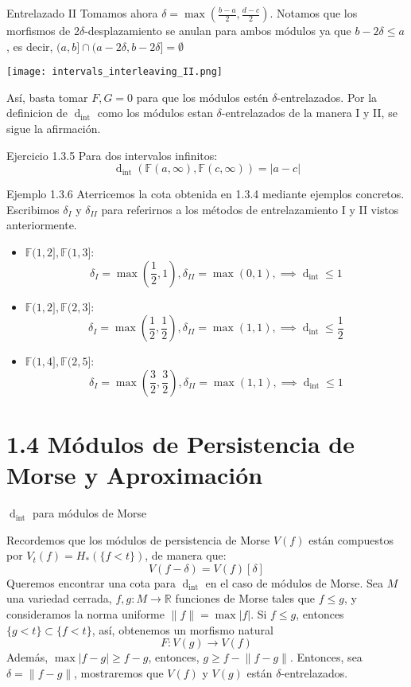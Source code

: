 \documentclass{beamer}
\newcounter{Ejercicio}
\newcommand\norm[1]{\lVert#1\rVert}
\def\dint{\operatorname{d}_{\operatorname{int}}}
\def \FF{{\mathbb F}}
\def \re{{\mathbb R}}
\begin{document}
\begin{frame}{Entrelazado II}
Tomamos ahora \(\delta=\max \left( \frac{b-a}{2}, \frac{d-c}{2} \right)\). Notamos que los morfismos de 2$\delta$-desplazamiento se anulan para ambos módulos ya que \(b-2\delta\leq a\), es decir, \((a,b]\cap(a-2\delta,b-2\delta]=\emptyset\)
\begin{center}
\texttt{[image: intervals\_interleaving\_II.png]}
\end{center}
\pause
Así, basta tomar $F, G = 0$ para que los módulos estén $\delta$-entrelazados. Por la definicion de $\dint$ como los módulos estan $\delta$-entrelazados de la manera I y II, se sigue la afirmación. 
\end{frame}

\begin{frame}{Ejercicio 1.3.5}
Para dos intervalos infinitos:
\[\dint(\FF(a,\infty),\FF(c,\infty))=|a-c|\]

\end{frame}

\begin{frame}{Ejemplo 1.3.6}
Aterricemos la cota obtenida en 1.3.4 mediante ejemplos concretos. Escribimos $\delta_I$ y $\delta_{II}$ para referirnos a los métodos de entrelazamiento I y II vistos anteriormente. 
\pause
\begin{itemize}
    \item \(\FF(1,2], \FF(1,3]\):
        \[\delta_I=\max \left( \frac{1}{2}, 1 \right),\delta_{II}=\max \left( 0,1 \right), \implies \dint\leq1\]
        \pause
    \item \(\FF(1,2], \FF(2,3]\):
        \[\delta_I=\max \left( \frac{1}{2}, \frac{1}{2} \right),\delta_{II}=\max \left( 1, 1 \right), \implies \dint\leq\frac{1}{2}\]
        \pause
    \item \(\FF(1,4], \FF(2,5]\):
        \[\delta_I=\max \left( \frac{3}{2}, \frac{3}{2} \right),\delta_{II}=\max \left( 1, 1\right), \implies \dint\leq1\]
\end{itemize}
\end{frame}

\section{1.4 Módulos de Persistencia de Morse y Aproximación}
\begin{frame}{$\dint$ para módulos de Morse}

Recordemos que los módulos de persistencia de Morse $V(f)$ están compuestos por $V_t(f) = H_*(\{f<t\})$, de manera que:
\[V(f-\delta)=V(f)[\delta]\]
\pause
Queremos encontrar una cota para $\dint$ en el caso de módulos de Morse. Sea $M$ una variedad cerrada, \(f,g:M\to\re\) funciones de Morse tales que $f\leq g$, y consideramos la norma uniforme $\norm{f} = \max|f|$. 
\pause
Si $f\leq g$, entonces $\{g<t\}\subset\{f<t\}$, así, obtenemos un morfismo natural 
\[F:V(g)\to V(f)\]
Además, $\max |f-g|\geq f-g$, entonces, $g\geq f - \norm{f-g}$.
Entonces, sea $\delta=\norm{f-g}$, mostraremos que $V(f)$ y $V(g)$ están $\delta$-entrelazados.

\end{frame}
\end{document}
